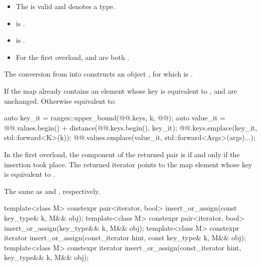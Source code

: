 \begin{itemdescr}
\pnum
\constraints
\begin{itemize}
\item
The  
is valid and denotes a type.
\item
{} is .
\item
{} is .
\item
For the first overload,
 and
 are both .
\end{itemize}

\pnum
\expects
The conversion from  into  constructs
an object ,
for which  is .

\pnum
\effects
If the map already contains an element whose key is equivalent to ,
 and  are unchanged.
Otherwise equivalent to:
\begin{codeblock}
auto key_it = ranges::upper_bound(@@.keys, k, @@);
auto value_it = @@.values.begin() + distance(@@.keys.begin(), key_it);
@@.keys.emplace(key_it, std::forward<K>(k));
@@.values.emplace(value_it, std::forward<Args>(args)...);
\end{codeblock}

\pnum
\returns
In the first overload,
the  component of the returned pair is 
if and only if the insertion took place.
The returned iterator points to the map element
whose key is equivalent to .

\pnum
\complexity
The same as  and , respectively.
\end{itemdescr}

%
\begin{itemdecl}
template<class M>
  constexpr pair<iterator, bool> insert_or_assign(const key_type& k, M&& obj);
template<class M>
  constexpr pair<iterator, bool> insert_or_assign(key_type&& k, M&& obj);
template<class M>
  constexpr iterator insert_or_assign(const_iterator hint, const key_type& k, M&& obj);
template<class M>
  constexpr iterator insert_or_assign(const_iterator hint, key_type&& k, M&& obj);
\end{itemdecl}

